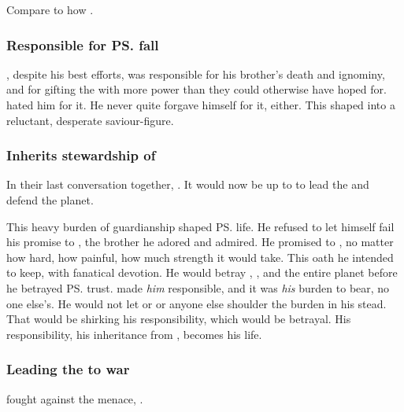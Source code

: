 Compare to how .











\subsubsection{Responsible for \ps{\Nexagglachel}{} fall}
\Ishna{}, despite his best efforts, was responsible for his brother's death and ignominy, and for gifting the \resphain{} with more power than they could otherwise have hoped for. 
\HriistD{} hated him for it.
He never quite forgave himself for it, either. 
This shaped \Ishna{} into a reluctant, desperate saviour-figure.





\subsubsection{Inherits stewardship of \Miith}
In their last conversation together, \Nexagglachel{} . 
It would now be up to \Ishnaruchaefir{} to lead the \dragons{} and defend the planet. 

This heavy burden of guardianship shaped \ps{\Ishnaruchaefir} life. 
He refused to let himself fail his promise to \Nexagglachel, the brother he adored and admired. 
He promised to , no matter how hard, how painful, how much strength it would take. 
This oath he intended to keep, with fanatical devotion. 
He would betray \Rystessakhin, \Secherdamon, \Nzessuacrith{} and the entire planet before he betrayed \ps{\Nexagglachel} trust. 
\Nexagglachel{} made \emph{him} responsible, and it was \emph{his} burden to bear, no one else's. 
He would not let \Rystessakhin{} or \Secherdamon{} or anyone else shoulder the burden in his stead. 
That would be shirking his responsibility, which would be betrayal. 
His responsibility, his inheritance from \Nexagglachel, becomes his life. 







\subsubsection{Leading the \dragons{} to war}
\Ishna{} fought against the \resphan{} menace, .







